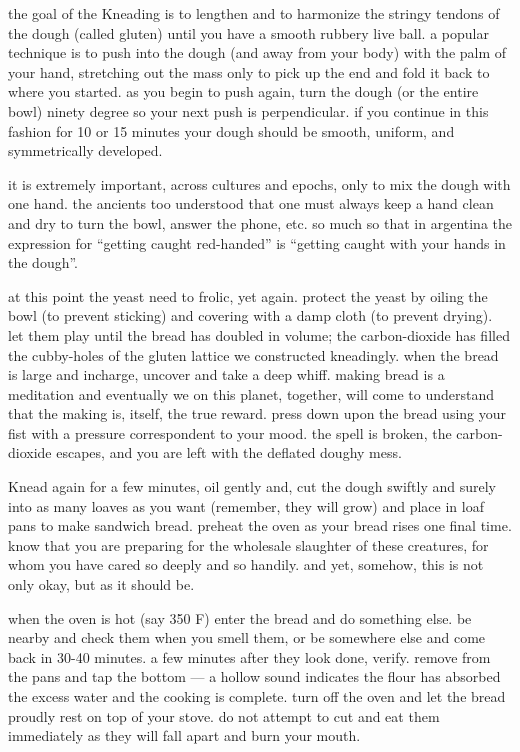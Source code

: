 the goal of the Kneading is to lengthen and to harmonize the stringy
tendons of the dough (called gluten) until you have a smooth rubbery
live ball. a popular technique is to push into the dough (and away
from your body) with the palm of your hand, stretching out the mass
only to pick up the end and fold it back to where you started. as you
begin to push again, turn the dough (or the entire bowl) ninety degree
so your next push is perpendicular. if you continue in this fashion
for 10 or 15 minutes your dough should be smooth, uniform, and
symmetrically developed.
	
it is extremely important, across cultures and epochs, only to mix the
dough with one hand. the ancients too understood that one must always
keep a hand clean and dry to turn the bowl, answer the phone, etc. so
much so that in argentina the expression for ``getting caught
red-handed'' is ``getting caught with your hands in the dough''.

at this point the yeast need to frolic, yet again. protect the yeast
by oiling the bowl (to prevent sticking) and covering with a damp
cloth (to prevent drying). let them play until the bread has doubled
in volume; the carbon-dioxide has filled the cubby-holes of the gluten
lattice we constructed kneadingly. when the bread is large and
incharge, uncover and take a deep whiff. making bread is a meditation
and eventually we on this planet, together, will come to understand
that the making is, itself, the true reward. press down upon the bread
using your fist with a pressure correspondent to your mood. the spell
is broken, the carbon-dioxide escapes, and you are left with the
deflated doughy mess.

Knead again for a few minutes, oil gently and, cut the dough swiftly
and surely into as many loaves as you want (remember, they will grow)
and place in loaf pans to make sandwich bread. preheat the oven as
your bread rises one final time. know that you are preparing for the
wholesale slaughter of these creatures, for whom you have cared so
deeply and so handily. and yet, somehow, this is not only okay, but as
it should be.

when the oven is hot (say 350 F) enter the bread and do something
else. be nearby and check them when you smell them, or be somewhere
else and come back in 30-40 minutes. a few minutes after they look
done, verify. remove from the pans and tap the bottom --- a hollow
sound indicates the flour has absorbed the excess water and the
cooking is complete. turn off the oven and let the bread proudly rest
on top of your stove. do not attempt to cut and eat them immediately
as they will fall apart and burn your mouth.

